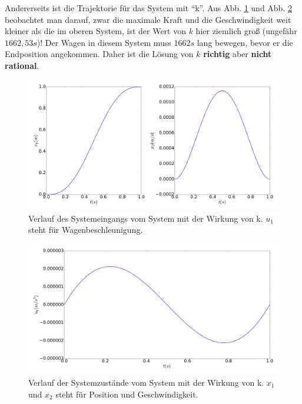\begin{beispiel}[Doppelintegrator]
	Andererseits ist die Trajektorie für das System mit ``k''. Aus Abb. \ref{fig:Doppelintegrator_mit_k_x} und Abb. \ref{fig:Doppelintegrator_mit_k_u} beobachtet man darauf, zwar die maximale Kraft und die Geschwindigkeit weit kleiner als die im oberen System, ist der Wert von $k$ hier ziemlich groß (ungefähr $1662,53s$)! Der Wagen in diesem System muss $1662s$ lang bewegen, bevor er die Endposition angekommen. Daher ist die Lösung von $k$ \textbf{richtig} aber \textbf{nicht rational}.
	\begin{figure}
		\centering
		\includegraphics[width=15.5cm]{bild/30_32/test0_mit_k_ori_x.pdf}
		\caption{Verlauf des Systemeingangs vom System mit der Wirkung von k. $u_{1}$ steht für Wagenbeschleunigung.}
		\label{fig:Doppelintegrator_mit_k_x}
	\end{figure}
	\begin{figure}
		\centering
		\includegraphics[width=12cm]{bild/30_32/test0_mit_k_ori_u.pdf}
		\caption{Verlauf der Systemzustände vom System mit der Wirkung von k. $x_{1}$ und $x_{2}$ steht für Position und Geschwindigkeit.}
		\label{fig:Doppelintegrator_mit_k_u}
	\end{figure}
	

\end{beispiel}
